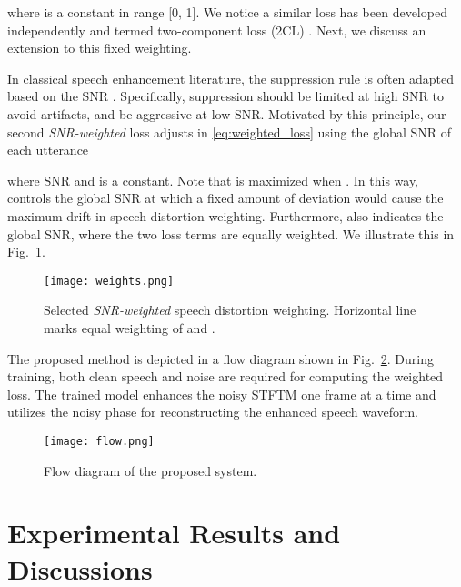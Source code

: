\documentclass{article}
\begin{document}
where  is a constant in range [0, 1]. We notice a similar loss has been developed independently and termed two-component loss (2CL) \cite{xu2019components}. Next, we discuss an extension to this fixed weighting.

In classical speech enhancement literature, the suppression rule is often adapted based on the \ac{SNR} \cite{esch2009,braun2015}. Specifically, suppression should be limited at high \ac{SNR} to avoid artifacts, and be aggressive at low \ac{SNR}. Motivated by this principle, our second \textit{SNR-weighted} loss adjusts  in \eqref{eq:weighted_loss} using the global \ac{SNR} of each utterance 

where SNR  and  is a constant. Note that \resizebox{0.3\columnwidth}{!}{} is maximized when . In this way,  controls the global \ac{SNR} at which a fixed amount of deviation would cause the maximum drift in speech distortion weighting. Furthermore,  also indicates the global \ac{SNR}, where the two loss terms are equally weighted. We illustrate this in Fig.~\ref{fig:weight}.

\begin{figure}[tb]
  \texttt{[image: weights.png]}
  \caption{Selected \textit{SNR-weighted} speech distortion weighting. Horizontal line marks equal weighting of  and .}
  \label{fig:weight}
\end{figure}

The proposed method is depicted in a flow diagram shown in Fig.~\ref{fig:flow}. During training, both clean speech and noise are required for computing the weighted loss. The trained model enhances the noisy \ac{STFTM} one frame at a time and utilizes the noisy phase for reconstructing the enhanced speech waveform.
\begin{figure}[tb]
 \texttt{[image: flow.png]}
 \setlength{\abovecaptionskip}{-5pt}
 \setlength{\belowcaptionskip}{-5pt}
 \caption{Flow diagram of the proposed system.}
 \label{fig:flow}
\end{figure}
\section{Experimental Results and Discussions}
\label{sec:exp}
\end{document}
